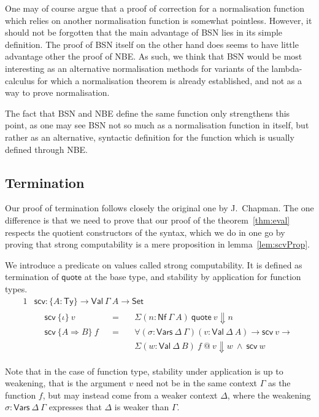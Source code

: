 \documentclass[a4paper,english,cleveref,autoref,draft]{lipics-v2019}
\newcommand{\agdaSymb}[1]{\mathsf{#1}}
\newcommand{\Set}{\agdaSymb{Set}}
\newcommand{\Ty}{\agdaSymb{Ty}}
\newcommand{\Vars}{\agdaSymb{Vars}}
\newcommand{\Val}{\agdaSymb{Val}}
\newcommand{\Nf}{\agdaSymb{Nf}}
\newcommand{\q}{\agdaSymb{quote}}
\newcommand{\scv}{\agdaSymb{scv}}
\newcommand{\Ra}{\Rightarrow}
\newcommand{\Da}{\Downarrow}
\begin{document}
One may of course argue that a proof of correction for a normalisation function
which relies on another normalisation function is somewhat pointless.
However, it should not be forgotten that the main advantage of BSN lies in its
simple definition. The proof of BSN itself on the other hand does seems to have
little advantage other the proof of NBE. As such, we think that BSN would be
most interesting as an alternative normalisation methods for variants of the
lambda-calculus for which a normalisation theorem is already established, and
not as a way to prove normalisation.

The fact that BSN and NBE define the same function only strengthens this point,
as one may see BSN not so much as a normalisation function in itself, but rather
as an alternative, syntactic definition for the function which is usually
defined through NBE.

\subsection{Termination}
Our proof of termination follows closely the original one by J.~Chapman.
The one difference is that we need to prove that our proof of the
theorem~\ref{thm:eval} respects the quotient constructors of the syntax,
which we do in one go by proving that strong computability is a mere proposition
in lemma~\ref{lem:scvProp}.

We introduce a predicate on values called strong computability.
It is defined as termination of $\q$ at the base type,
and stability by application for function types.
\begin{alignat*}{1}
  & \scv : \{A : \Ty\} \to \Val\ \Gamma\ A \to \Set \\ &
  \begin{alignedat}{3}
    & \scv\ \{\iota\}\ v && =\ && \Sigma(n : \Nf\ \Gamma\ A)\ \q\ v \Da n \\
    & \scv\ \{A \Ra B\}\ f && =\ &&
    \forall(\sigma : \Vars\ \Delta\ \Gamma) (v : \Val\ \Delta\ A) \to \scv\ v \to \\
    & && && \Sigma(w : \Val\ \Delta\ B)\ f\ @\ v \Da w \ \land\ \scv\ w
  \end{alignedat}
\end{alignat*}

Note that in the case of function type, stability under application is up to
weakening, that is the argument $v$ need not be in the same context $\Gamma$
as the function $f$, but may instead come from a weaker context $\Delta$,
where the weakening $\sigma : \Vars\ \Delta\ \Gamma$ expresses that $\Delta$
is weaker than $\Gamma$.
\end{document}
